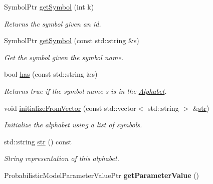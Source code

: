 \begin{DoxyCompactItemize}
Symbol\+Ptr \hyperlink{classtops_1_1Alphabet_ada9bbe4368c00ca714b99ba49bd9d350}{get\+Symbol} (int k)
\begin{DoxyCompactList}\small\item\em Returns the symbol given an id. \end{DoxyCompactList}\item 
\mbox{\label{classtops_1_1Alphabet_a74ceff8279639cdafc261e70bb37f6ea}} 
Symbol\+Ptr \hyperlink{classtops_1_1Alphabet_a74ceff8279639cdafc261e70bb37f6ea}{get\+Symbol} (const std\+::string \&s)
\begin{DoxyCompactList}\small\item\em Get the symbol given the symbol name. \end{DoxyCompactList}\item 
bool \hyperlink{classtops_1_1Alphabet_af41f8fcef3a5e540a8af63afc85df668}{has} (const std\+::string \&s)
\begin{DoxyCompactList}\small\item\em Returns true if the symbol name s is in the \hyperlink{classtops_1_1Alphabet}{Alphabet}. \end{DoxyCompactList}\item 
\mbox{\label{classtops_1_1Alphabet_ab0d2d98fe0612f204aaf59e6e18f7c8b}} 
void \hyperlink{classtops_1_1Alphabet_ab0d2d98fe0612f204aaf59e6e18f7c8b}{initialize\+From\+Vector} (const std\+::vector$<$ std\+::string $>$ \&\hyperlink{classtops_1_1Alphabet_a85e599e3d65ffc47e3588c887fa2da95}{str})
\begin{DoxyCompactList}\small\item\em Initialize the alphabet using a list of symbols. \end{DoxyCompactList}\item 
\mbox{\label{classtops_1_1Alphabet_a85e599e3d65ffc47e3588c887fa2da95}} 
std\+::string \hyperlink{classtops_1_1Alphabet_a85e599e3d65ffc47e3588c887fa2da95}{str} () const
\begin{DoxyCompactList}\small\item\em String representation of this alphabet. \end{DoxyCompactList}\item 
\mbox{\label{classtops_1_1Alphabet_a3afc3b5cc761fcfb896839ac07b8144c}} 
Probabilistic\+Model\+Parameter\+Value\+Ptr {\bfseries get\+Parameter\+Value} ()
\end{DoxyCompactItemize}


